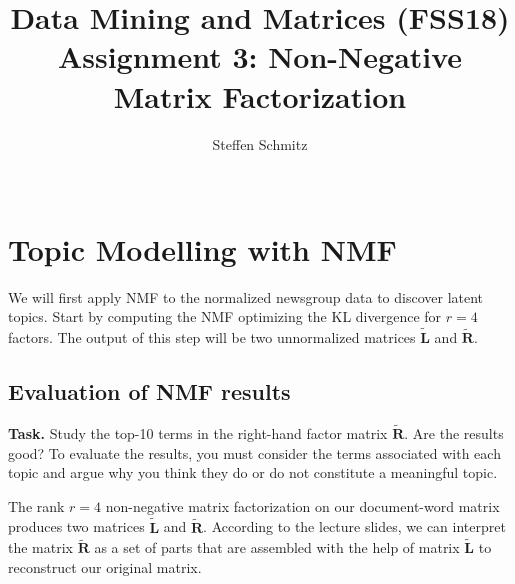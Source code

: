 \documentclass{support/acm_proc_article-sp}
\begin{document}
    \title{Data Mining and Matrices (FSS18) \\ Assignment 3: Non-Negative Matrix Factorization}

    \author{
    \alignauthor
    Steffen Schmitz\\
    \\
    }

    \maketitle


    \section{Topic Modelling with NMF}

    We will first apply NMF to the normalized newsgroup data to discover latent topics.
    Start by computing the NMF optimizing the KL divergence for $r = 4$ factors.
    The output of this step will be two unnormalized matrices $\mathbf{\tilde{L}}$ and $\mathbf{\tilde{R}}$.


    \subsection{Evaluation of NMF results}
    \label{subsec:nmf-r4-evaluation}

    \textbf{Task.} Study the top-10 terms in the right-hand factor matrix $\mathbf{\tilde{R}}$.
    Are the results good?
    To evaluate the results, you must consider the terms associated with each topic and argue why you think they do
    or do not constitute a meaningful topic.

    The rank $r = 4$ non-negative matrix factorization on our document-word matrix produces two matrices
    $\mathbf{\tilde{L}}$ and $\mathbf{\tilde{R}}$.
    According to the lecture slides, we can interpret the matrix $\mathbf{\tilde{R}}$ as a set of parts that are assembled
    with the help of matrix $\mathbf{\tilde{L}}$ to reconstruct our original matrix.
\end{document}
